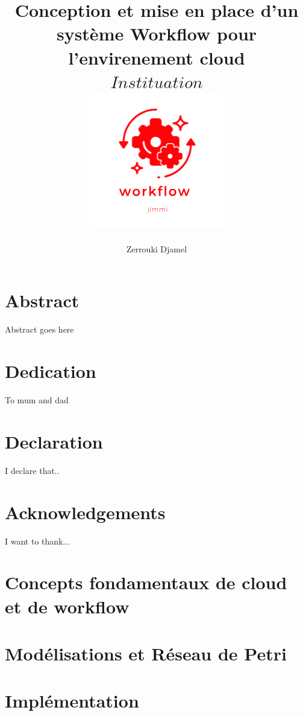 \documentclass[12pt,twoside]{report}
\title{
	{\textbf{Conception et mise en place d’un système Workflow  pour l’envirenement cloud}} \\   
	{$ Instituation $}\\
	{\includegraphics{logo.PNG}}
}
\author{Zerrouki Djamel}
\begin{document}
\maketitle
 
\chapter*{Abstract}
Abstract goes here

\chapter*{Dedication}
To mum and dad

\chapter*{Declaration}
I declare that..

\chapter*{Acknowledgements}
I want to thank...


\tableofcontents

\chapter{Concepts fondamentaux de cloud et de workflow }


\chapter{Modélisations et Réseau de Petri}
%

\chapter{Implémentation}
%
 

 \printbibliography
\end{document}
